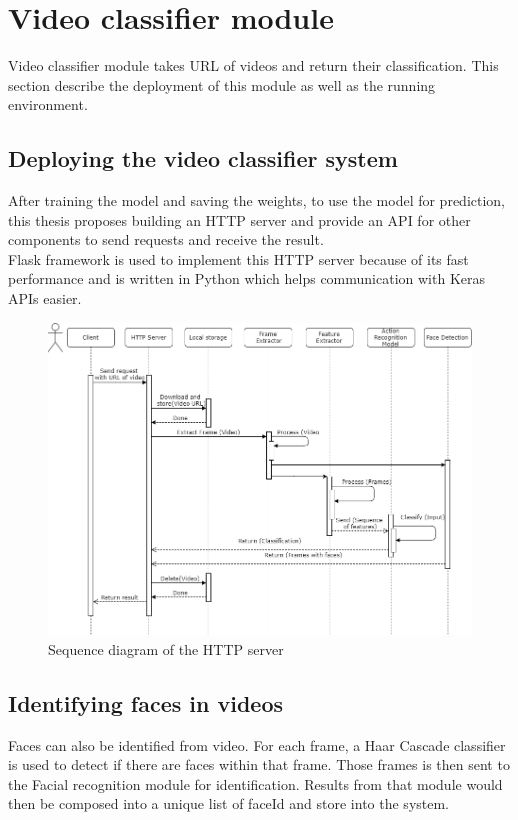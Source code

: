 \section{Video classifier module}
Video classifier module takes URL of videos and return their classification. This section describe the deployment of this module as well as the running environment.
\subsection{Deploying the video classifier system}
After training the model and saving the weights, to use the model for prediction, this thesis proposes building an HTTP server and provide an API for other components to send requests and receive the result. \\
Flask framework is used to implement this HTTP server because of its fast performance and is written in Python which helps communication with Keras APIs easier.
\begin{center}
    \begin{figure}[H]
    \centering
    \includegraphics[width=1\columnwidth]{images/chap4/server_sequence.png}
    \caption{Sequence diagram of the HTTP server}
    \end{figure}
\end{center}
\subsection{Identifying faces in videos}
Faces can also be identified from video. For each frame, a Haar Cascade classifier is used to detect if there are faces within that frame. Those frames is then sent to the Facial recognition module for identification. Results from that module  would then be composed into a unique list of faceId and store into the system.
